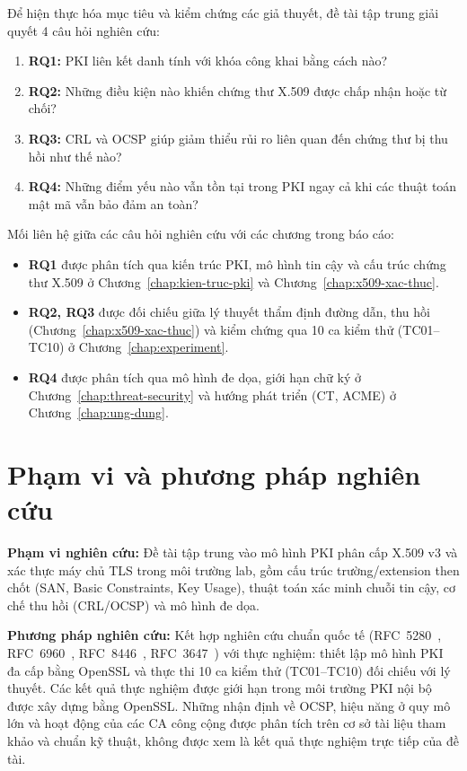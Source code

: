 Để hiện thực hóa mục tiêu và kiểm chứng các giả thuyết, đề tài tập trung giải quyết 4 câu hỏi nghiên cứu:
\begin{enumerate}
  \item \textbf{RQ1:} PKI liên kết danh tính với khóa công khai bằng cách nào?
  \item \textbf{RQ2:} Những điều kiện nào khiến chứng thư X.509 được chấp nhận hoặc từ chối?
  \item \textbf{RQ3:} CRL và OCSP giúp giảm thiểu rủi ro liên quan đến chứng thư bị thu hồi như thế nào?
  \item \textbf{RQ4:} Những điểm yếu nào vẫn tồn tại trong PKI ngay cả khi các thuật toán mật mã vẫn bảo đảm an toàn?
\end{enumerate}

Mối liên hệ giữa các câu hỏi nghiên cứu với các chương trong báo cáo:
\begin{itemize}
    \item \textbf{RQ1} được phân tích qua kiến trúc PKI, mô hình tin cậy và cấu trúc chứng thư X.509 ở Chương~\ref{chap:kien-truc-pki} và Chương~\ref{chap:x509-xac-thuc}.
    \item \textbf{RQ2, RQ3} được đối chiếu giữa lý thuyết thẩm định đường dẫn, thu hồi (Chương~\ref{chap:x509-xac-thuc}) và kiểm chứng qua 10 ca kiểm thử (TC01--TC10) ở Chương~\ref{chap:experiment}.
    \item \textbf{RQ4} được phân tích qua mô hình đe dọa, giới hạn chữ ký ở Chương~\ref{chap:threat-security} và hướng phát triển (CT, ACME) ở Chương~\ref{chap:ung-dung}.
\end{itemize}

\section{Phạm vi và phương pháp nghiên cứu}
\label{sec:scope-methodology}
\textbf{Phạm vi nghiên cứu:} Đề tài tập trung vào mô hình PKI phân cấp X.509 v3 và xác thực máy chủ TLS trong môi trường lab, gồm cấu trúc trường/extension then chốt (SAN, Basic Constraints, Key Usage), thuật toán xác minh chuỗi tin cậy, cơ chế thu hồi (CRL/OCSP) và mô hình đe dọa.

\textbf{Phương pháp nghiên cứu:} Kết hợp nghiên cứu chuẩn quốc tế (RFC~5280~\cite{rfc5280}, RFC~6960~\cite{rfc6960}, RFC~8446~\cite{rfc8446}, RFC~3647~\cite{rfc3647}) với thực nghiệm: thiết lập mô hình PKI đa cấp bằng OpenSSL và thực thi 10 ca kiểm thử (TC01--TC10) đối chiếu với lý thuyết. Các kết quả thực nghiệm được giới hạn trong môi trường PKI nội bộ được xây dựng bằng OpenSSL. Những nhận định về OCSP, hiệu năng ở quy mô lớn và hoạt động của các CA công cộng được phân tích trên cơ sở tài liệu tham khảo và chuẩn kỹ thuật, không được xem là kết quả thực nghiệm trực tiếp của đề tài.

